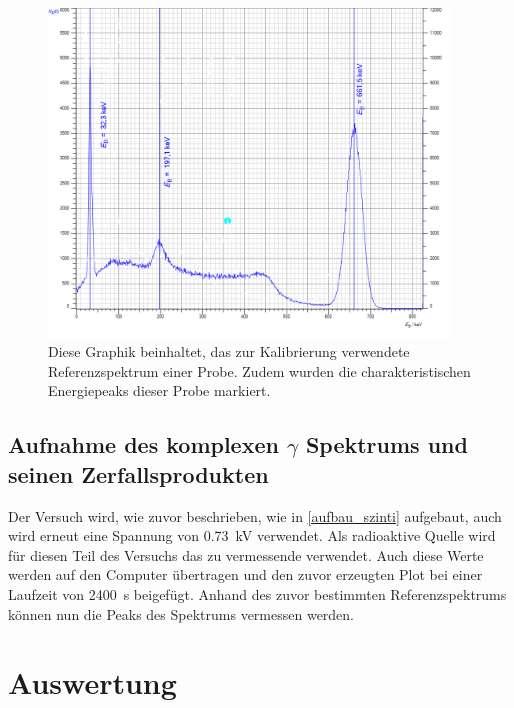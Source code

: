\documentclass[12pt,english,ngerman]{scrartcl}
\begin{document}
\begin{figure}[H]
	\begin{center}
		\includegraphics[width = 0.95\textwidth]{./figures/c137kalibrierung.png}
	\end{center}
	\caption[Kalibrierungsmessung einer ]{Diese Graphik
		beinhaltet, das zur Kalibrierung verwendete Referenzspektrum einer
		 Probe. Zudem wurden die charakteristischen Energiepeaks
		dieser Probe markiert.}\label{fig:kalibrierung}
\end{figure}

\subsection{Aufnahme des komplexen \texorpdfstring{$\gamma$}{gamma}
	Spektrums und seinen Zerfallsprodukten}\label{sec:aufname_Ra_zerfallsreihe}

Der Versuch wird, wie zuvor beschrieben, wie in \autoref{aufbau_szinti}
aufgebaut, auch wird erneut eine Spannung von \SI{0.73}{\kilo\volt} verwendet.
Als radioaktive Quelle wird für diesen Teil des Versuchs das zu vermessende
 verwendet. Auch diese Werte werden auf den Computer
übertragen und den zuvor erzeugten Plot bei einer Laufzeit von
\SI{2400}{\second} beigefügt. Anhand des zuvor bestimmten Referenzspektrums
können nun die Peaks des  Spektrums vermessen werden.

\section{Auswertung}\label{sec:Auswertung}
\end{document}
